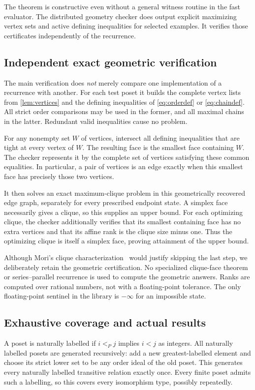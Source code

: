 \documentclass[11pt]{article}
\theoremstyle{definition}
\begin{document}
The theorem is constructive even without a general witness routine in the fast evaluator. The distributed geometry checker does output explicit maximizing vertex sets and active defining inequalities for selected examples. It verifies those certificates independently of the recurrence.

\subsection{Independent exact geometric verification}\label{sec:independent}
The main verification does \emph{not} merely compare one implementation of a recurrence with another. For each test poset it builds the complete vertex lists from \cref{lem:vertices} and the defining inequalities of \eqref{eq:orderdef} or \eqref{eq:chaindef}. All strict order comparisons may be used in the former, and all maximal chains in the latter. Redundant valid inequalities cause no problem.

For any nonempty set $W$ of vertices, intersect all defining inequalities that are tight at every vertex of $W$. The resulting face is the smallest face containing $W$. The checker represents it by the complete set of vertices satisfying these common equalities. In particular, a pair of vertices is an edge exactly when this smallest face has precisely those two vertices.

It then solves an exact maximum-clique problem in this geometrically recovered edge graph, separately for every prescribed endpoint state. A simplex face necessarily gives a clique, so this supplies an upper bound. For each optimizing clique, the checker additionally verifies that its smallest containing face has no extra vertices and that its affine rank is the clique size minus one. Thus the optimizing clique is itself a simplex face, proving attainment of the upper bound.

Although Mori's clique characterization~\cite{Mori2025} would justify skipping the last step, we deliberately retain the geometric certification. No specialized clique-face theorem or series--parallel recurrence is used to compute the geometric answers. Ranks are computed over rational numbers, not with a floating-point tolerance. The only floating-point sentinel in the library is $-\infty$ for an impossible state.

\subsection{Exhaustive coverage and actual results}
A poset is naturally labelled if $i<_Pj$ implies $i<j$ as integers. All naturally labelled posets are generated recursively: add a new greatest-labelled element and choose its strict lower set to be any order ideal of the old poset. This generates every naturally labelled transitive relation exactly once. Every finite poset admits such a labelling, so this covers every isomorphism type, possibly repeatedly.
\end{document}
